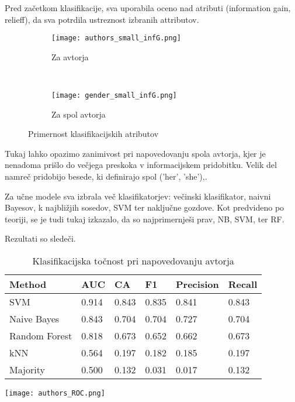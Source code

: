 \documentclass[a4paper,11pt]{article}
\newcommand{\rulesep}{\unskip\ \vrule\ }
\begin{document}
Pred začetkom klasifikacije, sva uporabila oceno nad atributi (information gain, relieff), da sva potrdila ustreznost izbranih attributov.\\

\begin{figure}[H]
\centering
\begin{subfigure}{0.48\textwidth}
  \centering
  \texttt{[image: authors\_small\_infG.png]}
  \caption{Za avtorja}
  \label{slika2}
\end{subfigure}%
\rulesep
\begin{subfigure}{0.48\textwidth}
  \centering
  \texttt{[image: gender\_small\_infG.png]}
  \caption{Za spol avtorja}
  \label{slika3}
\end{subfigure}
\caption{Primernost klasifikacijskih atributov}
\label{fig:test}
\end{figure}

Tukaj lahko opazimo zanimivost pri napovedovanju spola avtorja, kjer je nenadoma prišlo do večjega preskoka v informacijskem 
pridobitku. Velik del namreč pridobijo besede, ki definirajo spol ('her', 'she'),.

Za učne modele sva izbrala več klasifikatorjev: večinski klasifikator, naivni Bayesov, k najbližjih sosedov, SVM ter naključne gozdove.
Kot predvideno po teoriji, se je tudi tukaj izkazalo, da so najprimernješi prav, NB, SVM, ter RF.

Rezultati so sledeči.\\

\begin{table}[ht]
  \begin{varwidth}[b]{0.7\linewidth}
    \centering
    \begin{tabular}{ l | l  l  l  l  l }
    \hline
    Method & AUC & CA & F1 & Precision & Recall \\ \hline \hline
    SVM & 0.914 & 0.843 & 0.835 & 0.841 & 0.843 \\ \hline
    Naive Bayes & 0.843 & 0.704 & 0.704 & 0.727 & 0.704 \\ \hline
    Random Forest & 0.818 & 0.673 & 0.652 & 0.662 & 0.673 \\ \hline
    kNN & 0.564 & 0.197 & 0.182 & 0.185 & 0.197 \\ \hline
    \hline
    Majority & 0.500 & 0.132 & 0.031 & 0.017 & 0.132 \\ \hline \hline
    \end{tabular}
    \caption{Klasifikacijska točnost pri napovedovanju avtorja}
    \label{table:tocnost}
  \end{varwidth}%
  \hfill
  \begin{minipage}[b]{0.3\linewidth}
    \centering
    \texttt{[image: authors\_ROC.png]}
    \label{slika4}
  \end{minipage}
\end{table}
\end{document}

